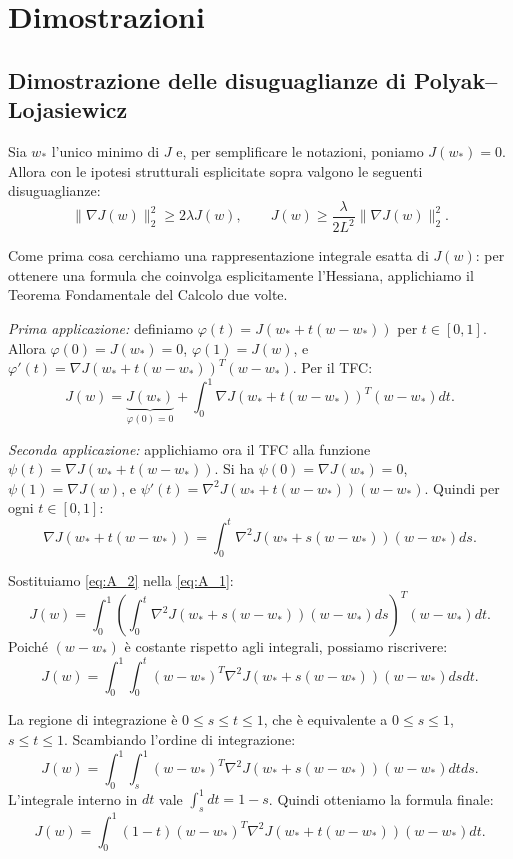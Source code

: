 \documentclass[a4paper,12pt]{article}
\numberwithin{equation}{section}
\numberwithin{figure}{section}
\numberwithin{table}{section}
\begin{document}
\appendix
\section{Dimostrazioni}\label{app:dimostrazioni}

\subsection{Dimostrazione delle disuguaglianze di \newline Polyak--Lojasiewicz}\label{app:pl}

Sia $w_*$ l'unico minimo di $J$ e, per semplificare le notazioni, poniamo $J(w_*) = 0$. Allora con le ipotesi strutturali esplicitate sopra valgono le seguenti disuguaglianze:
\[
\|\nabla J(w)\|_2^2 \geq 2\lambda J(w), \qquad J(w) \geq \frac{\lambda}{2L^2} \|\nabla J(w)\|_2^2.
\]

Come prima cosa cerchiamo una rappresentazione integrale esatta di $J(w)$: per ottenere una formula che coinvolga esplicitamente l'Hessiana, applichiamo il Teorema Fondamentale del Calcolo due volte.

\textit{Prima applicazione:} definiamo $\varphi(t) = J(w_* + t(w - w_*))$ per $t \in [0, 1]$. Allora $\varphi(0) = J(w_*) = 0$, $\varphi(1) = J(w)$, e $\varphi'(t) = \nabla J(w_* + t(w - w_*))^T (w - w_*)$. Per il TFC:
\[
J(w) = \underbrace{J(w_*)}_{\varphi(0)=0} + \int_0^1 \nabla J(w_* + t(w - w_*))^T (w - w_*) dt. \tag{A.1}\label{eq:A_1}
\]

\textit{Seconda applicazione:} applichiamo ora il TFC alla funzione $\psi(t) = \nabla J(w_* + t(w - w_*))$. Si ha $\psi(0) = \nabla J(w_*) = 0$, $\psi(1) = \nabla J(w)$, e $\psi'(t) = \nabla^2 J(w_* + t(w - w_*))(w - w_*)$. Quindi per ogni $t \in [0, 1]$:
\[
\nabla J(w_* + t(w - w_*)) = \int_0^t \nabla^2 J(w_* + s(w - w_*))(w - w_*) ds. \tag{A.2}\label{eq:A_2}
\]

Sostituiamo \eqref{eq:A_2} nella \eqref{eq:A_1}:
\[
J(w) = \int_0^1 \left( \int_0^t \nabla^2 J(w_* + s(w - w_*))(w - w_*) ds \right)^T (w - w_*) dt.
\]
Poiché $(w - w_*)$ è costante rispetto agli integrali, possiamo riscrivere:
\[
J(w) = \int_0^1 \int_0^t (w - w_*)^T \nabla^2 J(w_* + s(w - w_*))(w - w_*) ds dt.
\]

La regione di integrazione è $0 \leq s \leq t \leq 1$, che è equivalente a $0 \leq s \leq 1$, $s \leq t \leq 1$. Scambiando l'ordine di integrazione:
\[
J(w) = \int_0^1 \int_s^1 (w - w_*)^T \nabla^2 J(w_* + s(w - w_*))(w - w_*) dt ds.
\]
L'integrale interno in $dt$ vale $\int_s^1 dt = 1 - s$. Quindi otteniamo la formula finale:
\[
J(w) = \int_0^1 (1 - t) (w - w_*)^T \nabla^2 J(w_* + t(w - w_*))(w - w_*) dt. \tag{A.3}\label{eq:A_3}
\]
\end{document}
